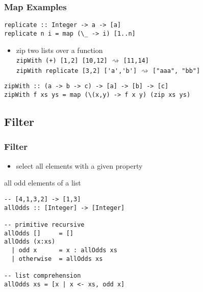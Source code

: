 \documentclass[dvipsnames]{beamer}
\theoremstyle{plain}
\begin{document}
\begin{frame}[fragile]
  \frametitle{Map Examples}

  \begin{exampleblock}{}
    \begin{lstlisting}
replicate :: Integer -> a -> [a]
replicate n i = map (\_ -> i) [1..n]
    \end{lstlisting}
  \end{exampleblock}

  \pause
  \begin{itemize}
    \item zip two lists over a function\\
      \lstinline{zipWith (+) [1,2] [10,12]} $\rightsquigarrow$
      \lstinline{[11,14]}\\
      \lstinline{zipWith replicate [3,2] ['a','b']} $\rightsquigarrow$
      \lstinline{["aaa", "bb"]}
  \end{itemize}

  \begin{exampleblock}{}
    \begin{lstlisting}
zipWith :: (a -> b -> c) -> [a] -> [b] -> [c]
zipWith f xs ys = map (\(x,y) -> f x y) (zip xs ys)
    \end{lstlisting}
  \end{exampleblock}
\end{frame}

\subsection{Filter}

\begin{frame}[fragile]
  \frametitle{Filter}

  \begin{itemize}
    \item select all elements with a given property
  \end{itemize}

  \begin{exampleblock}{all odd elements of a list}
    \begin{lstlisting}
-- [4,1,3,2] -> [1,3]
allOdds :: [Integer] -> [Integer]

-- primitive recursive
allOdds []     = []
allOdds (x:xs)
  | odd x      = x : allOdds xs
  | otherwise  = allOdds xs

-- list comprehension
allOdds xs = [x | x <- xs, odd x]
    \end{lstlisting}
  \end{exampleblock}
\end{frame}
\end{document}
